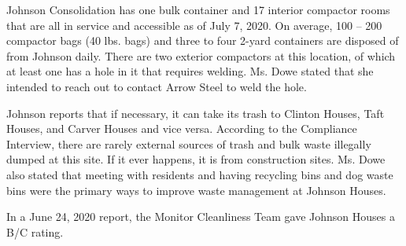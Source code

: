 Johnson Consolidation has one bulk container and 17 interior compactor rooms that are all in service and accessible as of July 7, 2020. On average, 100 -- 200 compactor bags (40 lbs. bags) and three to four 2-yard containers are disposed of from Johnson daily. There are two exterior compactors at this location, of which at least one has a hole in it that requires welding. Ms. Dowe stated that she intended to reach out to contact Arrow Steel to weld the hole.

Johnson reports that if necessary, it can take its trash to Clinton Houses, Taft Houses, and Carver Houses and vice versa. According to the Compliance Interview, there are rarely external sources of trash and bulk waste illegally dumped at this site. If it ever happens, it is from construction sites. Ms. Dowe also stated that meeting with residents and having recycling bins and dog waste bins were the primary ways to improve waste management at Johnson Houses. 

In a June 24, 2020 report, the Monitor Cleanliness Team gave Johnson Houses a B/C rating.